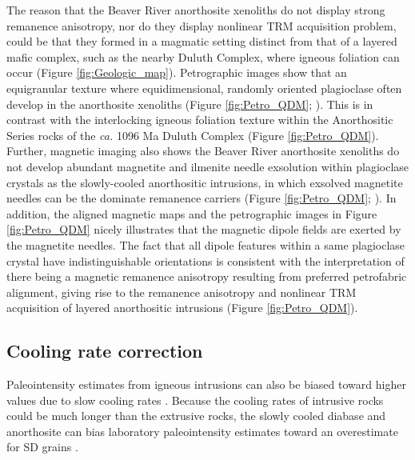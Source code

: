 \documentclass[draft]{agujournal2019}
\begin{document}
The reason that the Beaver River anorthosite xenoliths do not display strong remanence anisotropy, nor do they display nonlinear TRM acquisition problem, could be that they formed in a magmatic setting distinct from that of a layered mafic complex, such as the nearby Duluth Complex, where igneous foliation can occur (Figure \ref{fig:Geologic_map}). Petrographic images show that an equigranular texture where equidimensional, randomly oriented plagioclase often develop in the anorthosite xenoliths (Figure \ref{fig:Petro_QDM}; ). This is in contrast with the interlocking igneous foliation texture within the Anorthositic Series rocks of the \textit{ca.} 1096 Ma Duluth Complex (Figure \ref{fig:Petro_QDM}). Further, magnetic imaging also shows the Beaver River anorthosite xenoliths do not develop abundant magnetite and ilmenite needle exsolution within plagioclase crystals as the slowly-cooled anorthositic intrusions, in which exsolved magnetite needles can be the dominate remanence carriers (Figure \ref{fig:Petro_QDM}; ). In addition, the aligned magnetic maps and the petrographic images in Figure \ref{fig:Petro_QDM} nicely illustrates that the magnetic dipole fields are exerted by the magnetite needles. The fact that all dipole features within a same plagioclase crystal have indistinguishable orientations is consistent with the interpretation of there being a magnetic remanence anisotropy resulting from preferred petrofabric alignment, giving rise to the remanence anisotropy and nonlinear TRM acquisition of layered anorthositic intrusions (Figure \ref{fig:Petro_QDM}). 

\subsection*{Cooling rate correction}
Paleointensity estimates from igneous intrusions can also be biased toward higher values due to slow cooling rates \cite{Halgedahl1980a}. Because the cooling rates of intrusive rocks could be much longer than the extrusive rocks, the slowly cooled diabase and anorthosite can bias laboratory paleointensity estimates toward an overestimate for SD grains \cite{Dodson1980a, Halgedahl1980a, Selkin2000a}. 
\end{document}
